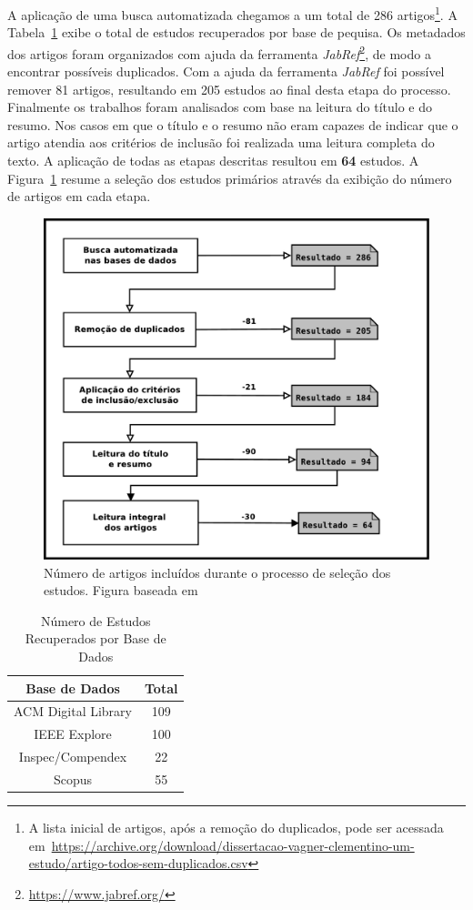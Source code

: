 A aplicação de uma busca automatizada chegamos a um total de 286
artigos\footnote{A lista inicial de artigos, após a remoção do duplicados, pode
    ser acessada
    em~\url{https://archive.org/download/dissertacao-vagner-clementino-um-estudo/artigo-todos-sem-duplicados.csv}}.
A Tabela~\ref{tab:estudos-por-base-dados} exibe o total de estudos recuperados
por base de pequisa. Os metadados dos artigos foram organizados com ajuda da
ferramenta \textit{JabRef}\footnote{\url{https://www.jabref.org/}}, de modo a
encontrar possíveis duplicados. Com a ajuda da ferramenta \textit{JabRef} foi
possível remover 81 artigos, resultando em 205 estudos ao final desta etapa do
processo. Finalmente os trabalhos foram analisados com base na leitura do
título e do resumo. Nos casos em que o título e o resumo não eram capazes de
indicar que o artigo atendia aos critérios de inclusão foi realizada uma
leitura completa do texto. A aplicação de todas as etapas descritas resultou em
\textbf{64} estudos. A Figura~\ref{fig:diagrama-processo-selecao} resume a
seleção dos estudos primários através da exibição do número de artigos em cada
etapa.

\begin{figure} \centering \includegraphics[width=0.75\linewidth]
	{./chapter-mapeamento-sistematico/img/diagrama-processo-selecao.pdf}
	\caption{Número de artigos incluídos durante o processo de seleção dos
		estudos. Figura baseada em~\cite{Petersen2015}}\label{fig:diagrama-processo-selecao}
\end{figure}

\begin{table}[htb]
	\centering
	\begin{tabular}{cc}
		\toprule
		\textbf{Base de Dados} & \textbf{Total} \\
		\midrule
	   	ACM Digital Library & 109\\
	   	IEEE Explore        & 100\\
		Inspec/Compendex    & 22 \\ 
		Scopus              & 55 \\
		\bottomrule
	\end{tabular}
	\caption{Número de Estudos Recuperados por Base de Dados}\label{tab:estudos-por-base-dados}
\end{table}

